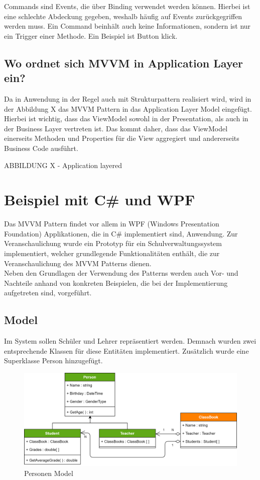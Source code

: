 \documentclass[titlepage=false,12pt]{scrreprt}
\begin{document}
Commands sind Events, die über Binding verwendet werden können. Hierbei ist eine schlechte
Abdeckung gegeben, weshalb häufig auf Events zurückgegriffen werden muss. Ein Command
beinhält auch keine Informationen, sondern ist nur ein Trigger einer Methode. Ein Beispiel
ist Button klick.

\section{Wo ordnet sich MVVM in Application Layer ein?}

Da in Anwendung in der Regel auch mit Strukturpattern realisiert wird, wird in der Abbildung X
das MVVM Pattern in das Application Layer Model eingefügt. Hierbei ist wichtig, dass das
ViewModel sowohl in der Presentation, als auch in der Business Layer vertreten ist. Das kommt
daher, dass das ViewModel einerseits Methoden und Properties für die View aggregiert und andererseits
Business Code ausführt.  

ABBILDUNG X - Application layered

\chapter{Beispiel mit C\# und WPF}

Das MVVM Pattern findet vor allem in WPF (Windows Presentation Foundation) Applikationen, die in C\#
implementiert sind, Anwendung.
Zur Veranschaulichung wurde ein Prototyp für ein Schulverwaltungssystem implementiert, welcher
grundlegende Funktionalitäten enthält, die zur Veranschaulichung des MVVM Patterns dienen.\\
Neben den Grundlagen der Verwendung des Patterns werden auch Vor- und Nachteile anhand von konkreten
Beispielen, die bei der Implementierung aufgetreten sind, vorgeführt.

\section{Model}

Im System sollen Schüler und Lehrer repräsentiert werden. Demnach wurden zwei entsprechende
Klassen für diese Entitäten implementiert. Zusätzlich wurde eine Superklasse Person hinzugefügt.

\begin{figure}[h]
	\includegraphics[width=\textwidth]{SchoolPersonUML.png}
	\caption[]{Personen Model}
\end{figure}
\end{document}
